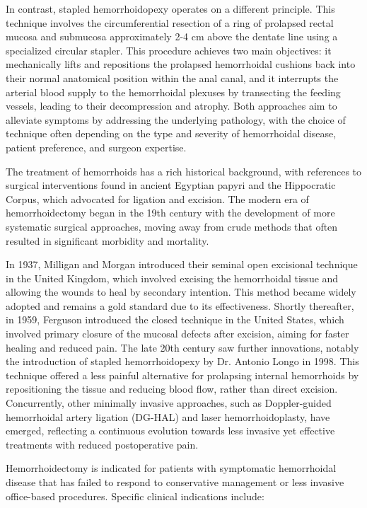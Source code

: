 In contrast, stapled hemorrhoidopexy operates on a different principle. This technique involves the circumferential resection of a ring of prolapsed rectal mucosa and submucosa approximately 2-4 cm above the dentate line using a specialized circular stapler. This procedure achieves two main objectives: it mechanically lifts and repositions the prolapsed hemorrhoidal cushions back into their normal anatomical position within the anal canal, and it interrupts the arterial blood supply to the hemorrhoidal plexuses by transecting the feeding vessels, leading to their decompression and atrophy. Both approaches aim to alleviate symptoms by addressing the underlying pathology, with the choice of technique often depending on the type and severity of hemorrhoidal disease, patient preference, and surgeon expertise.

The treatment of hemorrhoids has a rich historical background, with references to surgical interventions found in ancient Egyptian papyri and the Hippocratic Corpus, which advocated for ligation and excision. The modern era of hemorrhoidectomy began in the 19th century with the development of more systematic surgical approaches, moving away from crude methods that often resulted in significant morbidity and mortality.

In 1937, Milligan and Morgan introduced their seminal open excisional technique in the United Kingdom, which involved excising the hemorrhoidal tissue and allowing the wounds to heal by secondary intention. This method became widely adopted and remains a gold standard due to its effectiveness. Shortly thereafter, in 1959, Ferguson introduced the closed technique in the United States, which involved primary closure of the mucosal defects after excision, aiming for faster healing and reduced pain. The late 20th century saw further innovations, notably the introduction of stapled hemorrhoidopexy by Dr. Antonio Longo in 1998. This technique offered a less painful alternative for prolapsing internal hemorrhoids by repositioning the tissue and reducing blood flow, rather than direct excision. Concurrently, other minimally invasive approaches, such as Doppler-guided hemorrhoidal artery ligation (DG-HAL) and laser hemorrhoidoplasty, have emerged, reflecting a continuous evolution towards less invasive yet effective treatments with reduced postoperative pain.

Hemorrhoidectomy is indicated for patients with symptomatic hemorrhoidal disease that has failed to respond to conservative management or less invasive office-based procedures. Specific clinical indications include:

